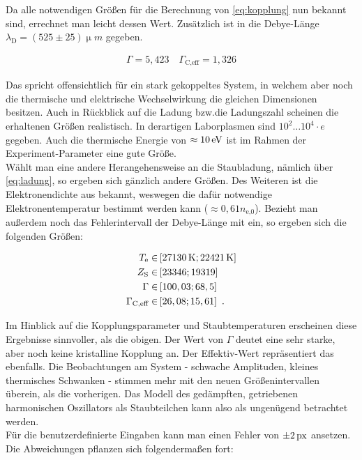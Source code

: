 \documentclass[numbers=noenddot,a4paper,notitlepage,twoside,BCOR15mm]{scrartcl}
\newcommand{\tenpo}[1]{ 10^{#1}}
\newcommand{\ix}[1]{_\text{#1}}
\begin{document}
		Da alle notwendigen Größen für die Berechnung von \autoref{eq:kopplung} nun bekannt sind, errechnet man leicht dessen Wert. Zusätzlich ist in \cite{EMAUGreifswaldPlasm} die Debye-Länge $\lambda\ix{D}=(525\pm25)\unit{\upmu m}$ gegeben.

			\begin{align}
				\Gamma=5,423\quad\Gamma\ix{C,eff}=1,326 \label{eq:koppwert}
			\end{align}

		Das spricht offensichtlich für ein stark gekoppeltes System, in welchem aber noch die thermische und elektrische Wechselwirkung die gleichen Dimensionen besitzen. Auch in Rückblick auf die Ladung bzw.die Ladungszahl scheinen die erhaltenen Größen realistisch. In derartigen Laborplasmen sind $\tenpo{2}\dots\tenpo{4}\cdot e$ gegeben. Auch die thermische Energie von $\approx\unit[10]{eV}$ ist im Rahmen der Experiment-Parameter eine gute Größe.\\
		Wählt man eine andere Herangehensweise an die Staubladung, nämlich über \autoref{eq:ladung}, so ergeben sich gänzlich andere Größen. Des Weiteren ist die Elektronendichte aus \cite{EMAUGreifswaldPlasm} bekannt, weswegen die dafür notwendige Elektronentemperatur bestimmt werden kann ($\approx0,61n\ix{e,0}$). Bezieht man außerdem noch das Fehlerintervall der Debye-Länge mit ein, so ergeben sich die folgenden Größen:

			\begin{align}
				T\ix{e}\in&\left[\unit[27130]{K}; \unit[22421]{K}\right] \nonumber\\
				Z\ix{S}\in&\left[23346; 19319\right] \nonumber\\
				\Gamma\in&\left[100,03; 68,5\right] \nonumber\\
				\Gamma\ix{C,eff}\in&\left[26,08; 15,61\right]\,\,. \nonumber
			\end{align}

		Im Hinblick auf die Kopplungsparameter und Staubtemperaturen erscheinen diese Ergebnisse sinnvoller, als die obigen. Der Wert von $\Gamma$ deutet eine sehr starke, aber noch keine kristalline Kopplung an. Der Effektiv-Wert repräsentiert das ebenfalls. Die Beobachtungen am System - schwache Amplituden, kleines thermisches Schwanken - stimmen mehr mit den neuen Größenintervallen überein, als die vorherigen. Das Modell des gedämpften, getriebenen harmonischen Oszillators als Staubteilchen kann also als ungenügend betrachtet werden.\\
		Für die benutzerdefinierte Eingaben kann man einen Fehler von $\pm\unit[2]{px}$ ansetzen. Die Abweichungen pflanzen sich folgendermaßen fort:
\end{document}
